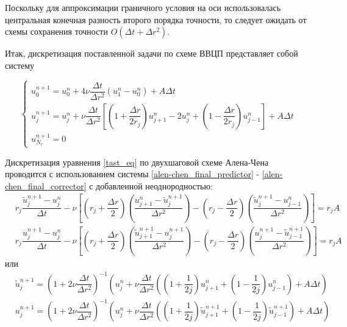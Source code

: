 Поскольку для аппроксимации граничного условия на оси использовалась центральная конечная разность второго порядка точности, то следует ожидать от схемы сохранения точности $O(\Delta t + \Delta r^2)$.

Итак, дискретизация поставленной задачи по схеме ВВЦП представляет собой систему

\begin{equation} \label{ftcs_num_final}
\begin{cases}
	u_0^{n+1} = u_0^n + 4 \nu \dfrac{\Delta t}{\Delta r^2} \left( u_1^n - u_0^n \right) + A\Delta t \\
	u_j^{n+1} = u_j^n + \nu \dfrac{\Delta t}{\Delta r^2} \left[ \left( 1 + \dfrac{\Delta r}{2 r_j} \right)u_{j+1}^n - 2u_j^n + \left( 1 - \dfrac{\Delta r}{2 r_j} \right)u_{j-1}^n \right] + A\Delta t
	\\
	u_{N_r}^{n+1} = 0
\end{cases}
\end{equation}







Дискретизация уравнения \eqref{tast_eq} по двухшаговой схеме Алена-Чена проводится с использованием системы \eqref{alen-chen_final_predictor} - \eqref{alen-chen_final_corrector} с добавленной неоднородностью:
\begin{align} \label{alen-chen_task_predictor}
	&r_j \dfrac{\tilde{u}_j^{n+1} - u_j^n}{\Delta t}	-
	\nu \left[ \left(r_j + \dfrac{\Delta r}{2}\right) \left( \dfrac{u_{j+1}^{n} - \tilde{u}_j^{n+1}}{\Delta r^2} \right) -
	\left(r_j - \dfrac{\Delta r}{2}\right) \left( \dfrac{\tilde{u}_{j}^{n+1} - u_{j-1}^{n}}{\Delta r^2} \right) \right] = r_jA \\
	\label{alen-chen_task_corrector}
	&r_j \dfrac{u_j^{n+1} - u_j^n}{\Delta t} -
	\nu \left[ \left(r_j + \dfrac{\Delta r}{2}\right) \left( \dfrac{\tilde{u}_{j+1}^{n+1} - u_j^{n+1}}{\Delta r^2} \right) -
	\left(r_j - \dfrac{\Delta r}{2}\right) \left( \dfrac{u_{j}^{n+1} - \tilde{u}_{j-1}^{n+1}}{\Delta r^2} \right) \right] = r_jA
\end{align}
или
\begin{align}
	&\tilde{u}_j^{n+1} = \left( 1 + 2 \nu \dfrac{\Delta t}{\Delta r^2} \right)^{-1} \left( u_j^n + \nu \dfrac{\Delta t}{\Delta r^2}
	\left( \left( 1 + \dfrac{1}{2j} \right) u_{j+1}^n + \left( 1 - \dfrac{1}{2j} \right) u_{j-1}^n \right)  + A\Delta t  \right)\\
	&u_j^{n+1} = \left( 1 + 2 \nu \dfrac{\Delta t}{\Delta r^2} \right)^{-1} \left( u_j^n + \nu \dfrac{\Delta t}{\Delta r^2}
	\left( \left( 1 + \dfrac{1}{2j} \right) \tilde{u}_{j+1}^{n+1} + \left( 1 - \dfrac{1}{2j} \right) \tilde{u}_{j-1}^{n+1} \right)  + A \Delta t \right)
\end{align}

